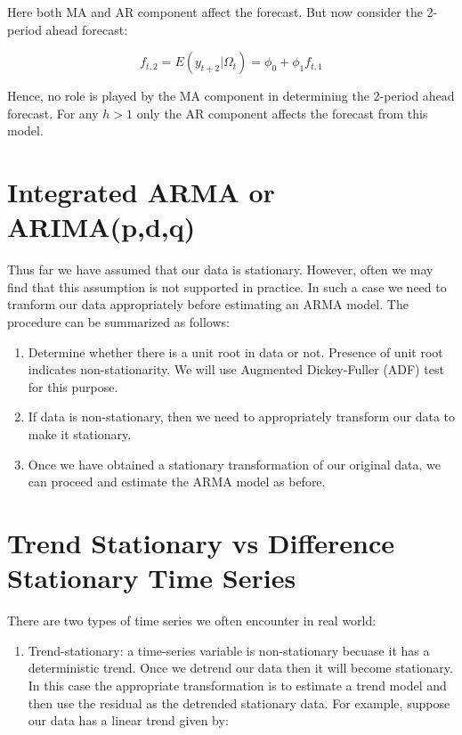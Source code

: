 \documentclass[]{book}
\providecommand{\tightlist}{%
  \setlength{\itemsep}{0pt}\setlength{\parskip}{0pt}}
\theoremstyle{definition}
\theoremstyle{definition}
\theoremstyle{definition}
\theoremstyle{remark}
\begin{document}
Here both MA and AR component affect the forecast. But now consider the 2-period ahead forecast:

\[f_{t,2} = E(y_{t+2}|\Omega_t) = \phi_0 + \phi_1 f_{t,1}\]

Hence, no role is played by the MA component in determining the 2-period ahead forecast. For any \(h>1\) only the AR component affects the forecast from this model.

\hypertarget{integrated-arma-or-arimapdq}{%
\section{Integrated ARMA or ARIMA(p,d,q)}\label{integrated-arma-or-arimapdq}}

Thus far we have assumed that our data is stationary. However, often we may find that this assumption is not supported in practice. In such a case we need to tranform our data appropriately before estimating an ARMA model. The procedure can be summarized as follows:

\begin{enumerate}
\def\labelenumi{\arabic{enumi}.}
\item
  Determine whether there is a unit root in data or not. Presence of unit root indicates non-stationarity. We will use Augmented Dickey-Fuller (ADF) test for this purpose.
\item
  If data is non-stationary, then we need to appropriately transform our data to make it stationary.
\item
  Once we have obtained a stationary transformation of our original data, we can proceed and estimate the ARMA model as before.
\end{enumerate}

\hypertarget{trend-stationary-vs-difference-stationary-time-series}{%
\section{Trend Stationary vs Difference Stationary Time Series}\label{trend-stationary-vs-difference-stationary-time-series}}

There are two types of time series we often encounter in real world:

\begin{enumerate}
\def\labelenumi{\arabic{enumi}.}
\tightlist
\item
  Trend-stationary: a time-series variable is non-stationary becuase it has a deterministic trend. Once we detrend our data then it will become stationary. In this case the appropriate transformation is to estimate a trend model and then use the residual as the detrended stationary data. For example, suppose our data has a linear trend given by:
\end{enumerate}
\end{document}
